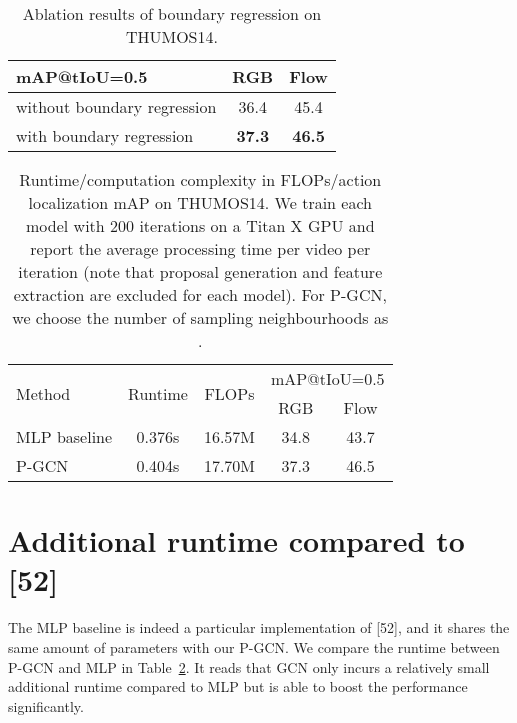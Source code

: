 \documentclass[10pt,twocolumn,letterpaper]{article}
\begin{document}
\begin{table}[!h]
\centering
	\caption{Ablation results of boundary regression on THUMOS14.}
	\begin{tabular}{l|c|c}
		\hline
		mAP@tIoU=0.5       & RGB    & Flow   \\ \hline
		without boundary regression & 36.4   & 45.4   \\
		with boundary regression      & \textbf{37.3}  & \textbf{46.5} \\ \hline
	\end{tabular}
	\label{tab:random}
	\vspace{-0.1in}
\end{table}

\begin{table}[!htb]
\centering
	\caption{Runtime/computation complexity in FLOPs/action localization mAP on THUMOS14. We train each model with 200 iterations on a Titan X GPU and report the average processing time per video per iteration (note that proposal generation and feature extraction are excluded for each model). For P-GCN, we choose the number of sampling neighbourhoods as .}
	\begin{tabular}{l|c|c|cc}
		\hline
		\multirow{2}{*}{Method} & \multirow{2}{*}{Runtime} & \multirow{2}{*}{FLOPs} & \multicolumn{2}{c}{mAP@tIoU=0.5} \\ \cline{4-5} 
		&                          &                        & RGB        & Flow       \\ \hline
		MLP baseline            & 0.376s                  & 16.57M                 & 34.8       & 43.7       \\
		P-GCN                   & 0.404s                  & 17.70M                 & 37.3       & 46.5       \\ \hline
	\end{tabular}
	\label{tab:runtime}
\end{table}

\section{Additional runtime compared to [52]}
The MLP baseline is indeed a particular implementation of [52], and it shares the same amount of parameters with our P-GCN. We compare the runtime between P-GCN and MLP in Table~\ref{tab:runtime}. It reads that GCN only incurs a relatively small additional runtime compared to MLP but is able to boost the performance significantly.
\end{document}
